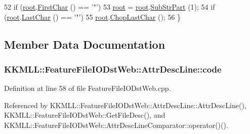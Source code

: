 \begin{DoxyCode}
52       \textcolor{keywordflow}{if}  (\hyperlink{class_feature_file_i_o_dst_web_1_1_attr_desc_line_a1b113dcf30d429e6a0db6042df2e9b51}{root}.\hyperlink{class_k_k_b_1_1_k_k_str_ac20e69c629b985c6569af914d9cc3e8c}{FirstChar} () == \textcolor{charliteral}{'"'})
53         \hyperlink{class_feature_file_i_o_dst_web_1_1_attr_desc_line_a1b113dcf30d429e6a0db6042df2e9b51}{root} = \hyperlink{class_feature_file_i_o_dst_web_1_1_attr_desc_line_a1b113dcf30d429e6a0db6042df2e9b51}{root}.\hyperlink{class_k_k_b_1_1_k_k_str_a5f20b2ddfc9f07c8ef99592810332ddb}{SubStrPart} (1);
54       \textcolor{keywordflow}{if}  (\hyperlink{class_feature_file_i_o_dst_web_1_1_attr_desc_line_a1b113dcf30d429e6a0db6042df2e9b51}{root}.\hyperlink{class_k_k_b_1_1_k_k_str_ad1951ace757c18c2d01df666b3a4032c}{LastChar} () == \textcolor{charliteral}{'"'})
55         \hyperlink{class_feature_file_i_o_dst_web_1_1_attr_desc_line_a1b113dcf30d429e6a0db6042df2e9b51}{root}.\hyperlink{class_k_k_b_1_1_k_k_str_af84ac251b246a683f8b45c6c15a62936}{ChopLastChar} ();
56     \}
\end{DoxyCode}


\subsection{Member Data Documentation}
\subsubsection[{\texorpdfstring{code}{code}}]{ K\+K\+M\+L\+L\+::\+Feature\+File\+I\+O\+Dst\+Web\+::\+Attr\+Desc\+Line\+::code}\hypertarget{class_feature_file_i_o_dst_web_1_1_attr_desc_line_a95a0f1eedd7d8b881b40b57b4d0d8eba}{}\label{class_feature_file_i_o_dst_web_1_1_attr_desc_line_a95a0f1eedd7d8b881b40b57b4d0d8eba}


Definition at line 58 of file Feature\+File\+I\+O\+Dst\+Web.\+cpp.



Referenced by K\+K\+M\+L\+L\+::\+Feature\+File\+I\+O\+Dst\+Web\+::\+Attr\+Desc\+Line\+::\+Attr\+Desc\+Line(), K\+K\+M\+L\+L\+::\+Feature\+File\+I\+O\+Dst\+Web\+::\+Get\+File\+Desc(), and K\+K\+M\+L\+L\+::\+Feature\+File\+I\+O\+Dst\+Web\+::\+Attr\+Desc\+Line\+Comparator\+::operator()().

